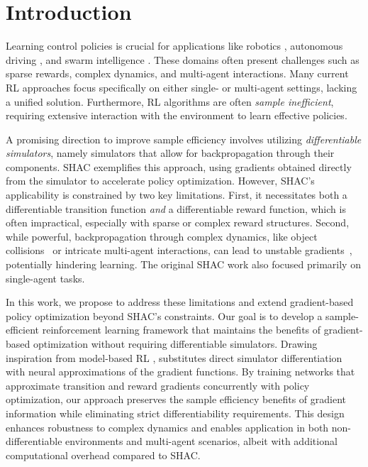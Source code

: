 
\section{Introduction}\label{sect:introduction}
Learning control policies is crucial for applications like robotics \cite{Singh22}, autonomous driving \cite{Elallid22}, and swarm intelligence \cite{Tang21}. These domains often present challenges such as sparse rewards, complex dynamics, and multi-agent interactions. Many current RL approaches focus specifically on either single- or multi-agent settings, lacking a unified solution. Furthermore, RL algorithms are often \emph{sample inefficient}, requiring extensive interaction with the environment to learn effective policies.

A promising direction to improve sample efficiency involves utilizing \emph{differentiable simulators}, namely simulators that allow for backpropagation through their components. SHAC \cite{Xu22} exemplifies this approach, using gradients obtained directly from the simulator to accelerate policy optimization. However, SHAC's applicability is constrained by two key limitations. First, it necessitates both a differentiable transition function \emph{and} a differentiable reward function, which is often impractical, especially with sparse or complex reward structures. Second, while powerful, backpropagation through complex dynamics, like object collisions~\cite{Georgiev24} or intricate multi-agent interactions, can lead to unstable gradients~\cite{Bengio94, Metz21}, potentially hindering learning. The original SHAC work also focused primarily on single-agent tasks.

In this work, we propose \fname{} to address these limitations and extend gradient-based policy optimization beyond SHAC's constraints. Our goal is to develop a sample-efficient reinforcement learning framework that maintains the benefits of gradient-based optimization without requiring differentiable simulators. Drawing inspiration from model-based RL \cite{DBLP:conf/icml/HafnerLFVHLD19, DBLP:conf/iclr/HafnerLB020}, \fname{} substitutes direct simulator differentiation with neural approximations of the gradient functions. By training networks that approximate transition and reward gradients concurrently with policy optimization, our approach preserves the sample efficiency benefits of gradient information while eliminating strict differentiability requirements. This design enhances robustness to complex dynamics and enables application in both non-differentiable environments and multi-agent scenarios, albeit with additional computational overhead compared to SHAC.

